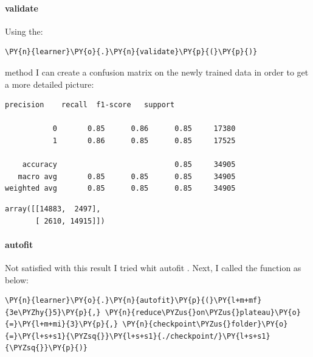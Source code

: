 \paragraph{validate}
Using the:
    \begin{tcolorbox}[breakable, size=fbox, boxrule=1pt, pad at break*=1mm,colback=cellbackground, colframe=cellborder]
\begin{Verbatim}[commandchars=\\\{\},fontsize=\footnotesize]
\PY{n}{learner}\PY{o}{.}\PY{n}{validate}\PY{p}{(}\PY{p}{)}
\end{Verbatim}
\end{tcolorbox}method I can create a confusion matrix on the newly trained data in order to get a more detailed picture:
    \begin{Verbatim}[commandchars=\\\{\},fontsize=\footnotesize]
              precision    recall  f1-score   support

           0       0.85      0.86      0.85     17380
           1       0.86      0.85      0.85     17525

    accuracy                           0.85     34905
   macro avg       0.85      0.85      0.85     34905
weighted avg       0.85      0.85      0.85     34905

    \end{Verbatim}
            \begin{tcolorbox}[breakable, size=fbox, boxrule=.5pt, pad at break*=1mm, opacityfill=0]
\begin{Verbatim}[commandchars=\\\{\},fontsize=\footnotesize]
array([[14883,  2497],
       [ 2610, 14915]])
\end{Verbatim}
\end{tcolorbox}
        

\paragraph{autofit}
Not satisfied with this result I tried whit autofit \cite{noauthor_amaiyaktrainautofit_nodate}.
Next, I called the function as below:
    \begin{tcolorbox}[breakable, size=fbox, boxrule=1pt, pad at break*=1mm,colback=cellbackground, colframe=cellborder]
\begin{Verbatim}[commandchars=\\\{\},fontsize=\footnotesize]
\PY{n}{learner}\PY{o}{.}\PY{n}{autofit}\PY{p}{(}\PY{l+m+mf}{3e\PYZhy{}5}\PY{p}{,} \PY{n}{reduce\PYZus{}on\PYZus{}plateau}\PY{o}{=}\PY{l+m+mi}{3}\PY{p}{,} \PY{n}{checkpoint\PYZus{}folder}\PY{o}{=}\PY{l+s+s1}{\PYZsq{}}\PY{l+s+s1}{./checkpoint/}\PY{l+s+s1}{\PYZsq{}}\PY{p}{)}
\end{Verbatim}
\end{tcolorbox}

